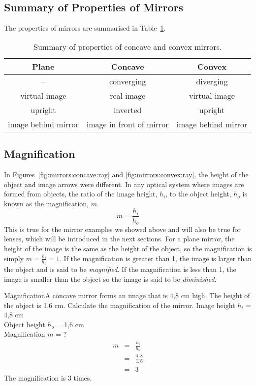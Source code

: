 \subsection{Summary of Properties of Mirrors}

The properties of mirrors are summarised in Table~\ref{tab:p:wsl:go10:mirrors:properties}.

\begin{table}[htbp]
\begin{center}
\caption{Summary of properties of concave and convex mirrors.}
\label{tab:p:wsl:go10:mirrors:properties}
\begin{tabular}{|c|c|c|}\hline
\textbf{Plane}&\textbf{Concave}&\textbf{Convex}\\\hline\hline
--&converging & diverging\\\hline
virtual image&real image & virtual image\\\hline
upright&inverted&upright\\\hline
image behind mirror&image in front of mirror&image behind mirror\\\hline
\end{tabular}
\end{center}
\end{table}

\subsection{Magnification}
In Figures~\ref{fig:mirrors:concave:ray} and \ref{fig:mirrors:convex:ray}, the height of the object and image arrows were different. In any optical system where images are formed from objects, the ratio of the image height, $h_i$, to the object height, $h_o$ is known as the magnification, $m$.
\begin{equation*}
m = \frac{h_i}{h_o}
\label{Magnification}
\end{equation*}
This is true for the mirror examples we showed above and will also be true for lenses, which will be introduced in the next sections. For a plane mirror, the height of the image is the same as the height of the object, so the magnification is simply $m = \frac{h_i}{h_o} = 1$. If the magnification is greater than 1, the image is larger than the object and is said to be \textit{magnified}. If the magnification is less than 1, the image is smaller than the object so the image is said to be \textit{diminished}.

\begin{wex}{Magnification}{A concave mirror forms an image that is 4,8 cm high. The height of the object is 1,6 cm. Calculate the magnification of the mirror.}{
Image height $h_i$ = 4,8 cm\\
Object height $h_o$ = 1,6 cm\\
Magnification $m$ = ?
\begin{eqnarray*}
m &=& \frac{h_i}{h_o}\\
&=& \frac{4,8}{1,6}\\
&=& 3
\end{eqnarray*}
The magnification is 3 times.
}
\end{wex}

